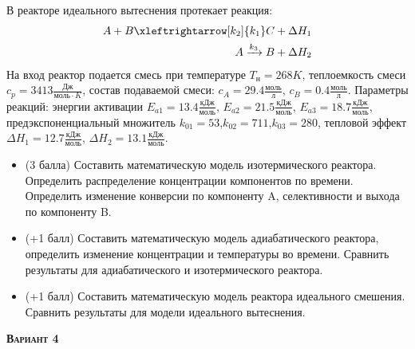  В реакторе идеального вытеснения протекает реакция: \begin{equation*} \begin{aligned} A+B \xleftrightarrow[k_2]{k_1} C +\Delta H_1 \\ A \xrightarrow{k_3} B + \Delta H_2 \end{aligned} \end{equation*}                                     На вход  реактор подается смесь при температуре $ T_н =  268 K$, теплоемкость смеси $c_p= 3413 \frac{Дж}{моль \cdot K}$, состав подаваемой смеси: $c_A=29.4 \frac{моль}{л}$, $c_B=0.4 \frac{моль}{л}$. Параметры реакций: энергии активации $E_{a1}=13.4 \frac{кДж}{моль}$, $E_{a2}=21.5  \frac{кДж}{моль}$, $E_{a3}=18.7  \frac{кДж}{моль}$, предэкспоненциальный множитель $k_{01}=        53$,$k_{02}=       711$,$k_{03}=       280$, тепловой эффект $\Delta H_1= 12.7  \frac{кДж}{моль}$, $\Delta H_2=13.1 \frac{кДж}{моль}$.\begin{itemize} \item (3 балла) Составить математическую модель изотермического реактора. Определить распределение концентрации компонентов по времени. Определить изменение конверсии по компоненту A, селективности и выхода по компоненту B. \item (+1 балл) Составить математическую модель адиабатического реактора, определить изменение концентрации и температуры во времени. Сравнить результаты для адиабатического и изотермического реактора. \item (+1 балл) Составить математическую модель реактора идеального смешения. Сравнить результаты для модели идеального вытеснения. \end{itemize}

\textsc{\textbf{Вариант 4}}

